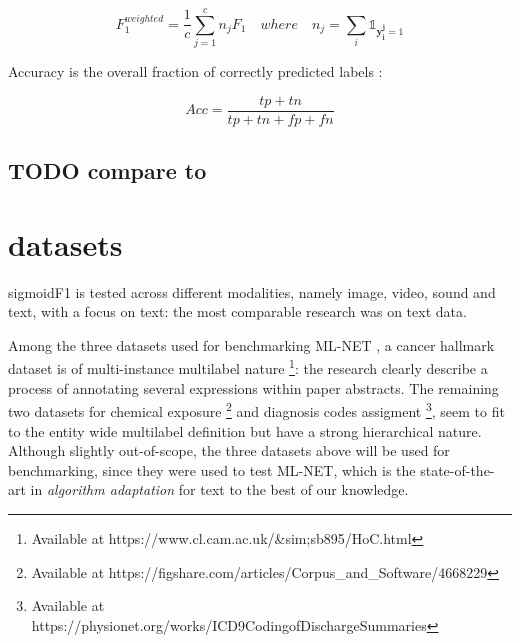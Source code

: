 \documentclass[sigconf,natbib,screen=true,review=true,anonymous]{acmart}
\newcommand\doubt[1]{\textcolor{orange}{DOUBT : #1}}
\begin{document}
$$F_1^{weighted} = \frac{1}{c} \sum_{j=1}^c n_j F_1 \quad where \quad n_j = \sum_i \mathds{1}_{\mathbf{y_i^j} = 1}$$


Accuracy is the overall fraction of correctly predicted labels \cite{threshForF1}:

$$
A c c=\frac{t p+t n}{t p+t n+f p+f n}
$$




\subsection*{{\color{red}\bfseries\sffamily TODO} compare to  \cite{lossComp}}
\label{sec:orgc40601c}
\clearpage

\section{datasets}
\label{sec:orgc2f1097}

sigmoidF1 is tested across different modalities, namely image, video, sound and text, with a focus on text: the most comparable research was on text data.



Among the three datasets used for benchmarking ML-NET \cite{multitaskLabel}, a cancer hallmark dataset is of multi-instance multilabel nature \cite{cancerHallmarks} \footnote{Available at https://www.cl.cam.ac.uk/&sim;sb895/HoC.html}: the research clearly describe a process of annotating several expressions within paper abstracts. The remaining two datasets for chemical exposure \cite{chemExposure} \footnote{Available at https://figshare.com/articles/Corpus_and_Software/4668229} and diagnosis codes assigment \cite{diagnosisCode} \footnote{Available at https://physionet.org/works/ICD9CodingofDischargeSummaries}, seem to fit to the entity wide multilabel definition but have a strong hierarchical nature. Although slightly out-of-scope, the three datasets above will be used for benchmarking, since they were used to test ML-NET, which is the state-of-the-art in \emph{algorithm adaptation} for text to the best of our knowledge.
\end{document}
